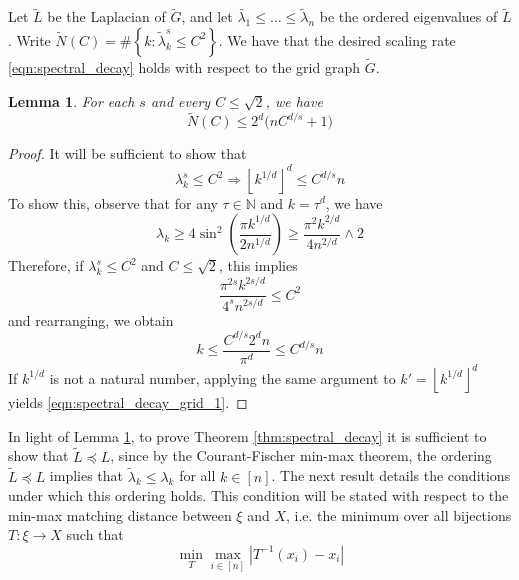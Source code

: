 \documentclass{article}
\newcommand{\abs}[1]{\left \lvert #1 \right \rvert}
\newcommand{\set}[1]{\left\{#1\right\}}
\newcommand{\floor}[1]{\left\lfloor #1 \right\rfloor}
\newcommand{\1}{\mathbf{1}}
\newcommand{\wt}[1]{\widetilde{#1}}
\theoremstyle{alden}
\theoremstyle{aldenthm}
\newtheorem{lemma}{Lemma}
\theoremstyle{definition}
\theoremstyle{remark}
\begin{document}
Let $\wt{L}$ be the Laplacian of $\wt{G}$, and let $\wt{\lambda_1} \leq \ldots \leq \wt{\lambda}_n$ be the ordered eigenvalues of $\wt{L}$. Write $\wt{N}(C) = \#\set{k: \wt{\lambda}_k^s \leq C^2}$. We have that the desired scaling rate \eqref{eqn:spectral_decay} holds with respect to the grid graph $\wt{G}$. 

\begin{lemma}
	\label{lem:spectral_decay_grid}
	For each $s$ and every $C \leq \sqrt{2}$, we have
	\begin{equation}
	\label{eqn:spectral_decay_grid}
	\wt{N}(C) \leq 2^d\big(n C^{d/s} + 1)
	\end{equation}
\end{lemma}
\begin{proof}
	It will be sufficient to show that 
	\begin{equation}
	\label{eqn:spectral_decay_grid_1}
	\lambda_k^s \leq C^2 \Rightarrow \floor{k^{1/d}}^d \leq C^{d/s}n
	\end{equation}
	To show this, observe that for any $\tau \in \mathbb{N}$ and $k = \tau^d$, we have
	\begin{equation*}
	\lambda_k \geq 4 \sin^2 \left(\frac{\pi k^{1/d}}{2n^{1/d}}\right) \geq \frac{\pi^2 k^{2/d}}{4 n^{2/d}} \wedge 2
	\end{equation*}
	Therefore, if $\lambda_k^s \leq C^2$ and $C \leq \sqrt{2}$, this implies
	\begin{equation*}
	\frac{\pi^{2s} k^{2s/d}}{4^s n^{2s/d}} \leq C^{2}
	\end{equation*}
	and rearranging, we obtain
	\begin{equation*}
	k \leq \frac{C^{d/s} 2^d n}{\pi^d} \leq C^{d/s}n
	\end{equation*}	
	If $k^{1/d}$ is not a natural number, applying the same argument to $k' = \floor{k^{1/d}}^d$ yields \eqref{eqn:spectral_decay_grid_1}.
\end{proof}

In light of Lemma \ref{lem:spectral_decay_grid}, to prove Theorem \ref{thm:spectral_decay} it is sufficient to show that $\wt{L} \preceq L$, since by the Courant-Fischer min-max theorem, the ordering $\wt{L} \preceq L$ implies that $\wt{\lambda}_k \leq \lambda_k$ for all $k \in [n]$. The next result details the conditions under which this ordering holds. This condition will be stated with respect to the min-max matching distance between $\xi$ and $X$, i.e. the minimum over all bijections $T: \xi \to X$ such that
\begin{equation*}
\min_{T} \max_{i \in [n]} \abs{T^{-1}(x_i) - x_i} 
\end{equation*}
\end{document}

